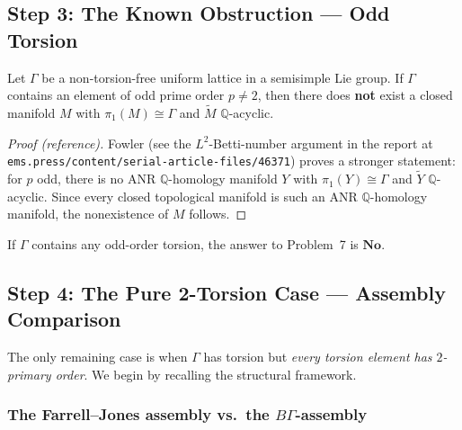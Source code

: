 \subsection*{Step 3: The Known Obstruction --- Odd Torsion}

\begin{theorem}\label{thm:q7-odd}
Let $\Gamma$ be a non-torsion-free uniform lattice in a semisimple Lie group.
If $\Gamma$ contains an element of odd prime order $p\ne 2$, then there does
\textbf{not} exist a closed manifold $M$ with $\pi_1(M)\cong\Gamma$ and
$\widetilde M$ $\mathbb Q$-acyclic.
\end{theorem}

\begin{proof}[Proof (reference)]
Fowler (see the $L^2$-Betti-number argument in the report at
\texttt{ems.press/content/serial-article-files/46371})
proves a stronger statement: for $p$ odd, there is no ANR $\mathbb Q$-homology manifold
$Y$ with $\pi_1(Y)\cong\Gamma$ and $\widetilde Y$ $\mathbb Q$-acyclic.
Since every closed topological manifold is such an ANR $\mathbb Q$-homology manifold,
the nonexistence of $M$ follows.
\end{proof}

\begin{corollary}\label{cor:q7-odd-answer}
If $\Gamma$ contains any odd-order torsion, the answer to Problem~7 is $\boxed{\textbf{No}}$.
\end{corollary}


\subsection*{Step 4: The Pure 2-Torsion Case --- Assembly Comparison}

The only remaining case is when $\Gamma$ has torsion but \emph{every torsion element
has $2$-primary order}.  We begin by recalling the structural framework.

\subsubsection*{The Farrell--Jones assembly vs.\ the $B\Gamma$-assembly}

